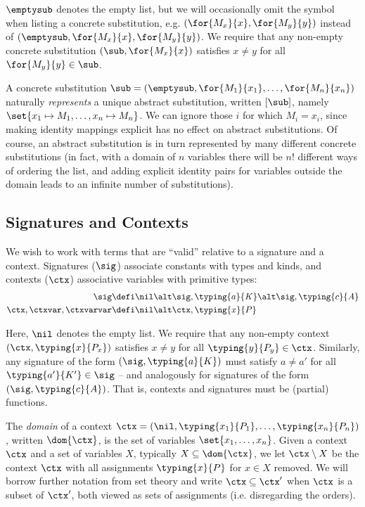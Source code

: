 $\emptysub$ denotes the empty list, but we will occasionally omit the symbol when listing a concrete substitution, e.g. $(\for{M_x}{x}, \for{M_y}{y})$ instead of $(\emptysub, \for{M_x}{x}, \for{M_y}{y})$.
We require that any non-empty concrete substitution $(\sub, \for{M_x}{x})$ satisfies $x \neq y$ for all $\for{M_y}{y} \in \sub$.

A concrete substitution $\sub = (\emptysub, \for{M_1}{x_1}, \ldots, \for{M_n}{x_n})$ naturally \emph{represents} a unique abstract substitution, written $[\sub]$, namely $\set{x_1 \mapsto M_1, \ldots, x_n \mapsto M_n}$.
We can ignore those $i$ for which $M_i = x_i$, since making identity mappings explicit has no effect on abstract substitutions.
Of course, an abstract substitution is in turn represented by many different concrete substitutions (in fact, with a domain of $n$ variables there will be $n!$ different ways of ordering the list, and adding explicit identity pairs for variables outside the domain leads to an infinite number of substitutions).



\subsection*{Signatures and Contexts}

We wish to work with terms that are ``valid'' relative to a signature and a context.
Signatures ($\sig$) associate constants with types and kinds, and contexts ($\ctx$) associative variables with primitive types:
\begin{align*}
  \sig &\defi \nil \alt \sig, \typing{a}{K} \alt \sig, \typing{c}{A} \\
  \ctx, \ctxvar, \ctxvarvar &\defi \nil \alt \ctx, \typing{x}{P}
\end{align*}

Here, $\nil$ denotes the empty list.
We require that any non-empty context $(\ctx, \typing{x}{P_x})$ satisfies $x \neq y$ for all $\typing{y}{P_y} \in \ctx$.
Similarly, any signature of the form $(\sig, \typing{a}{K})$ must satisfy $a \neq a'$ for all $\typing{a'}{K'} \in \sig$ -- and analogously for signatures of the form $(\sig, \typing{c}{A})$.
That is, contexts and signatures must be (partial) functions.

The \emph{domain} of a context $\ctx = (\nil, \typing{x_1}{P_1}, \ldots, \typing{x_n}{P_n})$, written $\dom{\ctx}$, is the set of variables $\set{x_1, \ldots, x_n}$.
Given a context $\ctx$ and a set of variables $X$, typically $X \subseteq \dom{\ctx}$, we let $\ctx \setminus X$ be the context $\ctx$ with all assignments $\typing{x}{P}$ for $x \in X$ removed.
We will borrow further notation from set theory and write $\ctx \subseteq \ctx'$ when $\ctx$ is a subset of $\ctx'$, both viewed as sets of assignments (i.e. disregarding the orders).

